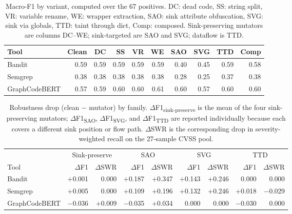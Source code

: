\begin{table}[h]
\centering
\caption{Macro-F1 by variant, computed over the 67 positives.
DC: dead code, SS: string split, VR: variable rename, WE: wrapper
extraction, SAO: sink attribute obfuscation, SVG: sink via globals,
TTD: taint through dict, Comp: composed. Sink-preserving mutators
are columns DC--WE; sink-targeted are SAO and SVG; dataflow is TTD.}
\label{tab:robustness}
\small
\setlength{\tabcolsep}{3.5pt}
\begin{tabular}{l r r r r r r r r r}
\hline
Tool & Clean & DC & SS & VR & WE & SAO & SVG & TTD & Comp \\
\hline
Bandit         & 0.59 & 0.59 & 0.59 & 0.59 & 0.59 & 0.40 & 0.45 & 0.59 & 0.58 \\
Semgrep        & 0.38 & 0.38 & 0.38 & 0.38 & 0.38 & 0.28 & 0.25 & 0.37 & 0.38 \\
GraphCodeBERT  & 0.57 & 0.59 & 0.60 & 0.60 & 0.61 & 0.60 & 0.57 & 0.60 & 0.60 \\
\hline
\end{tabular}
\end{table}

\begin{table}[h]
\centering
\caption{Robustness drop (clean $-$ mutator) by family.
$\Delta$F1\textsubscript{sink-preserve} is the mean of the four
sink-preserving mutators; $\Delta$F1\textsubscript{SAO},
$\Delta$F1\textsubscript{SVG}, and $\Delta$F1\textsubscript{TTD}
are reported individually because each covers a different sink
position or flow path. $\Delta$SWR is the corresponding drop in
severity-weighted recall on the 27-sample CVSS pool.}
\label{tab:robustness-drop}
\small
\setlength{\tabcolsep}{3.5pt}
\begin{tabular}{l r r r r r r r r}
\hline
& \multicolumn{2}{c}{Sink-preserve} & \multicolumn{2}{c}{SAO} & \multicolumn{2}{c}{SVG} & \multicolumn{2}{c}{TTD} \\
Tool & $\Delta$F1 & $\Delta$SWR & $\Delta$F1 & $\Delta$SWR & $\Delta$F1 & $\Delta$SWR & $\Delta$F1 & $\Delta$SWR \\
\hline
Bandit         & $+$0.001 & $0.000$  & $+$0.187 & $+$0.347 & $+$0.143 & $+$0.246 & $0.000$  & $0.000$  \\
Semgrep        & $+$0.005 & $0.000$  & $+$0.109 & $+$0.196 & $+$0.132 & $+$0.246 & $+$0.018 & $-$0.029 \\
GraphCodeBERT  & $-$0.036 & $+$0.009 & $-$0.035 & $+$0.034 & $0.000$  & $0.000$  & $-$0.030 & $0.000$  \\
\hline
\end{tabular}
\end{table}

